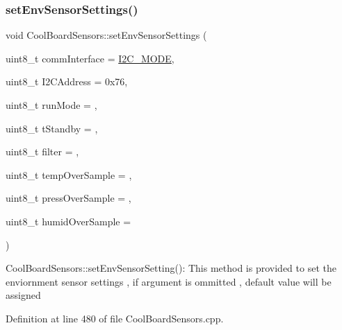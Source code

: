 \subsubsection{\texorpdfstring{set\+Env\+Sensor\+Settings()}{setEnvSensorSettings()}}
{\footnotesize\ttfamily void Cool\+Board\+Sensors\+::set\+Env\+Sensor\+Settings (\begin{DoxyParamCaption}\item[{uint8\+\_\+t}]{comm\+Interface = {\ttfamily \hyperlink{_cool_spark_fun_b_m_e280_8h_a5cd01756030509b764d43a2b8c94fce8}{I2\+C\+\_\+\+M\+O\+DE}},  }\item[{uint8\+\_\+t}]{I2\+C\+Address = {\ttfamily 0x76},  }\item[{uint8\+\_\+t}]{run\+Mode = {},  }\item[{uint8\+\_\+t}]{t\+Standby = {},  }\item[{uint8\+\_\+t}]{filter = {},  }\item[{uint8\+\_\+t}]{temp\+Over\+Sample = {},  }\item[{uint8\+\_\+t}]{press\+Over\+Sample = {},  }\item[{uint8\+\_\+t}]{humid\+Over\+Sample = {} }\end{DoxyParamCaption})}

Cool\+Board\+Sensors\+::set\+Env\+Sensor\+Setting()\+: This method is provided to set the enviornment sensor settings , if argument is ommitted , default value will be assigned 

Definition at line 480 of file Cool\+Board\+Sensors.\+cpp.


